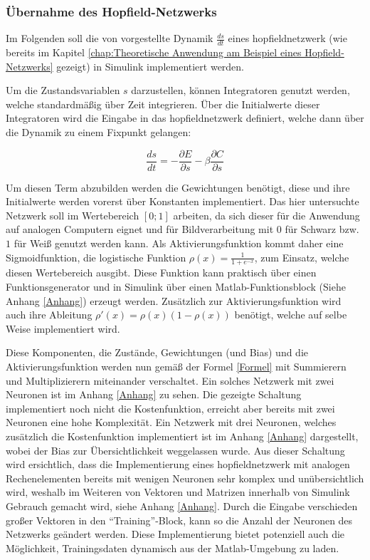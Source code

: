 \subsubsection{Übernahme des Hopfield-Netzwerks}
\label{chap:Übernahme des Hopfield-Netzwerks}

Im Folgenden soll die von \citeauthor{Scellier2017} vorgestellte Dynamik \(\frac{ds}{dt}\) eines \gls{hopfieldnetzwerk} (wie bereits im Kapitel \ref{chap:Theoretische Anwendung am Beispiel eines Hopfield-Netzwerks} gezeigt) in Simulink implementiert werden.

Um die Zustandsvariablen \(s\) darzustellen, können Integratoren genutzt werden, welche standardmäßig über Zeit integrieren. Über die Initialwerte dieser Integratoren wird die Eingabe in das \gls{hopfieldnetzwerk} definiert, welche dann über die Dynamik zu einem Fixpunkt gelangen:

\[\frac{ds}{dt}=-\frac{\partial{E}}{\partial{s}}-\beta\frac{\partial{C}}{\partial{s}}\]

Um diesen Term abzubilden werden die Gewichtungen benötigt, diese und ihre Initialwerte werden vorerst über Konstanten implementiert. Das hier untersuchte Netzwerk soll im Wertebereich \([0; 1]\) arbeiten, da sich dieser für die Anwendung auf analogen Computern eignet und für \zb Bildverarbeitung mit \(0\) für Schwarz bzw. \(1\) für Weiß genutzt werden kann. Als Aktivierungsfunktion kommt daher eine Sigmoidfunktion, die logistische Funktion \(\rho(x)=\frac{1}{1+e^{-x}}\), zum Einsatz, welche diesen Wertebereich ausgibt. Diese Funktion kann praktisch über einen Funktionsgenerator und in Simulink über einen Matlab-Funktionsblock (Siehe Anhang \ref{Anhang}) erzeugt werden. Zusätzlich zur Aktivierungsfunktion wird auch ihre Ableitung \(\rho'(x)=\rho(x)(1-\rho(x))\) benötigt, welche auf selbe Weise implementiert wird.

Diese Komponenten, die Zustände, Gewichtungen (und Bias) und die Aktivierungsfunktion werden nun gemäß der Formel \ref{Formel} mit Summierern und Multiplizierern miteinander verschaltet. Ein solches Netzwerk mit zwei Neuronen ist im Anhang \ref{Anhang} zu sehen. Die gezeigte Schaltung implementiert noch nicht die Kostenfunktion, erreicht aber bereits mit zwei Neuronen eine hohe Komplexität. Ein Netzwerk mit drei Neuronen, welches zusätzlich die Kostenfunktion implementiert ist im Anhang \ref{Anhang} dargestellt, wobei der Bias zur Übersichtlichkeit weggelassen wurde. Aus dieser Schaltung wird ersichtlich, dass die Implementierung eines \gls{hopfieldnetzwerk} mit analogen Rechenelementen bereits mit wenigen Neuronen sehr komplex und unübersichtlich wird, weshalb im Weiteren von Vektoren und Matrizen innerhalb von Simulink Gebrauch gemacht wird, siehe Anhang \ref{Anhang}. Durch die Eingabe verschieden großer Vektoren in den "`Training"'-Block, kann so die Anzahl der Neuronen des Netzwerks geändert werden. Diese Implementierung bietet potenziell auch die Möglichkeit, Trainingsdaten dynamisch aus der Matlab-Umgebung zu laden.
